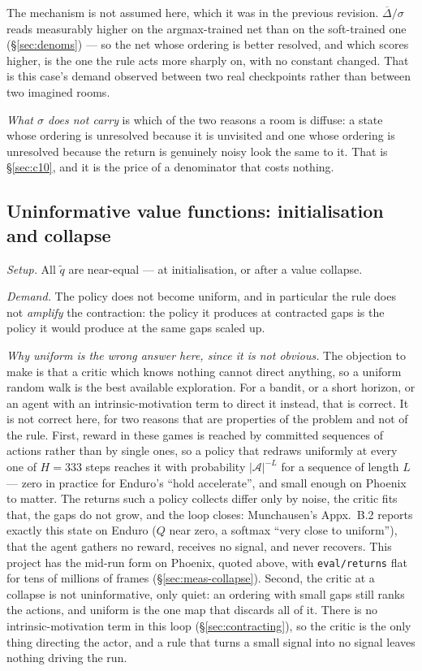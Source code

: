 \documentclass{article}
\newcommand{\actions}{\mathcal{A}}
\newcommand{\gapbar}{\overline{\Delta}}
\newcommand{\srank}{\sigma}
\begin{document}
The mechanism is not assumed here, which it was in the previous revision. $\gapbar/\srank$ reads
measurably higher on the argmax-trained net than on the soft-trained one
(\S\ref{sec:denoms}) --- so the net whose ordering is better resolved, and which scores higher, is
the one the rule acts more sharply on, with no constant changed.
That is this case's demand observed between two real checkpoints rather than between two
imagined rooms.

\emph{What $\srank$ does not carry} is which of the two reasons a room is diffuse: a state whose
ordering is unresolved because it is unvisited and one whose ordering is unresolved because the
return is genuinely noisy look the same to it. That is \S\ref{sec:c10}, and it is the price of a
denominator that costs nothing.

\subsection{Uninformative value functions: initialisation and collapse}
\label{sec:c6}

\emph{Setup.} All $\tilde{q}$ are near-equal --- at initialisation, or after a value collapse.

\emph{Demand.} The policy does not become uniform, and in particular the rule does not
\emph{amplify} the contraction: the policy it produces at contracted gaps is the policy it would
produce at the same gaps scaled up.

\emph{Why uniform is the wrong answer here, since it is not obvious.} The objection to make is
that a critic which knows nothing cannot direct anything, so a uniform random walk is the best
available exploration. For a bandit, or a short horizon, or an agent with an intrinsic-motivation
term to direct it instead, that is correct. It is not correct here, for two reasons that are
properties of the problem and not of the rule. First, reward in these games is reached by
committed sequences of actions rather than by single ones, so a policy that redraws uniformly at
every one of $H = 333$ steps reaches it with probability $|\actions|^{-L}$ for a sequence of
length $L$ --- zero in practice for Enduro's ``hold accelerate'', and small enough on Phoenix to
matter. The returns such a policy collects differ only by noise, the critic fits that, the gaps
do not grow, and the loop closes: Munchausen's Appx.~B.2 reports exactly this state on Enduro
($Q$ near zero, a softmax ``very close to uniform''), that the agent gathers no reward, receives
no signal, and never recovers. This project has the mid-run form on Phoenix, quoted above, with
\texttt{eval/returns} flat for tens of millions of frames (\S\ref{sec:meas-collapse}). Second,
the critic at a collapse is not
uninformative, only quiet: an ordering with small gaps still ranks the actions, and uniform is
the one map that discards all of it. There is no intrinsic-motivation term in this loop
(\S\ref{sec:contracting}), so the critic is the only thing directing the actor, and a rule that
turns a small signal into no signal leaves nothing driving the run.
\end{document}
